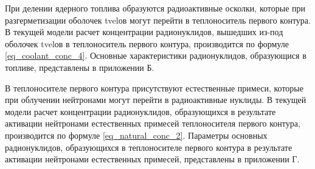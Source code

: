 При делении ядерного топлива образуются радиоактивные осколки, которые при разгерметизации оболочек \ac{tvel}ов могут 
перейти в теплоноситель первого контура. В текущей модели расчет концентрации радионуклидов, вышедших из-под оболочек 
\ac{tvel}ов в теплоноситель первого контура, производится по формуле \ref{eq_coolant_conc_4}. Основные характеристики 
радионуклидов, образующися в топливе, представлены в приложении Б.

В теплоносителе первого контура присутствуют естественные примеси, которые при облучении нейтронами могут перейти в 
радиоактивные нуклиды. В текущей модели расчет концентрации радионуклидов, образующихся в результате активации 
нейтронами естественных примесей теплоносителя первого контура, производится по формуле \ref{eq_natural_conc_2}. 
Параметры основных радионуклидов, образующихся в теплоносителе первого контура в результате активации нейтронами 
естественных примесей, представлены в приложении Г.


